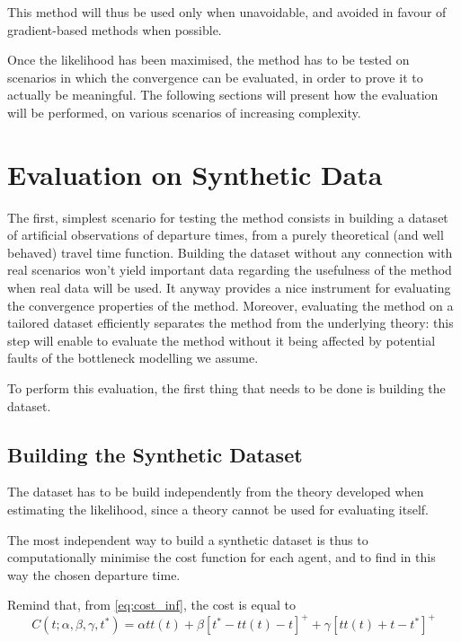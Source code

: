 This method will thus be used only when unavoidable,
and avoided in favour of gradient-based methods when possible.

Once the likelihood has been maximised,
the method has to be tested on scenarios in which the convergence can be evaluated,
in order to prove it to actually be meaningful.
The following sections will present how the evaluation will be performed,
on various scenarios of increasing complexity.

\section{Evaluation on Synthetic Data}
\label{sec:eval_synth}

The first, simplest scenario for testing the method consists in building a dataset of artificial observations of departure times,
from a purely theoretical (and well behaved) travel time function.
Building the dataset without any connection with real scenarios won't yield important data regarding the usefulness of the method when real data will be used.
It anyway provides a nice instrument for evaluating the convergence properties of the method.
Moreover, evaluating the method on a tailored dataset efficiently separates the method from the underlying theory:
this step will enable to evaluate the method without it being affected by potential faults of the bottleneck modelling we assume.

To perform this evaluation, the first thing that needs to be done is building the dataset.

\subsection{Building the Synthetic Dataset}
\label{sec:synth_dataset}

The dataset has to be build independently from the theory developed when estimating the likelihood,
since a theory cannot be used for evaluating itself.

The most independent way to build a synthetic dataset is thus to computationally minimise the cost function for each agent,
and to find in this way the chosen departure time.

Remind that, from \eqref{eq:cost_inf}, the cost is equal to
\begin{equation*}
  C(t; \alpha, \beta, \gamma, t^*) = \alpha tt(t) + \beta[t^* - tt(t) - t]^+ + \gamma[tt(t) + t - t^*]^+
\end{equation*}

